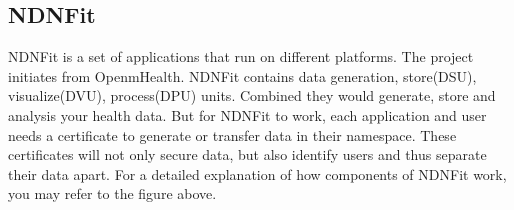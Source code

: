 \documentclass[a0,portrait]{poster}
\begin{document}
\begin{multicols}{2}

\subsection*{NDNFit\cite{zhang2018ndnfit}}
\par
	NDNFit is a set of applications that run on different platforms. 
	The project initiates from OpenmHealth. 
	NDNFit contains data generation, store(DSU), visualize(DVU), process(DPU) units. 
	Combined they would generate, store and analysis your health data.
	But for NDNFit to work, each application and user needs a certificate to generate or transfer data in their namespace.
	These certificates will not only secure data, but also identify users and thus separate their data apart.
	For a detailed explanation of how components of NDNFit work, you may refer to the figure above.


\end{multicols}
\end{document}
